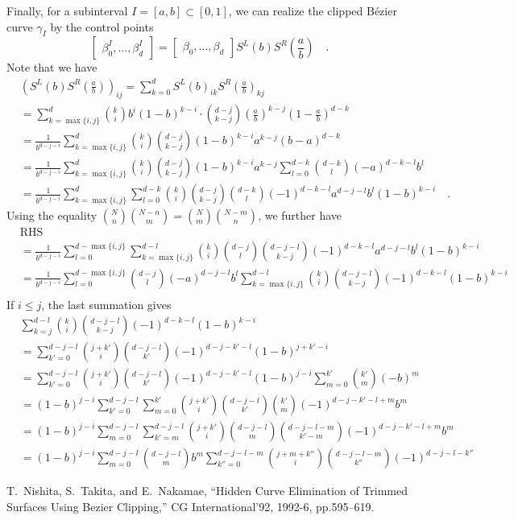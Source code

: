 \documentclass[pdftex,a4paper,12pt]{scrartcl}
\theoremstyle{plain}
\theoremstyle{definition}
\theoremstyle{remark}
\numberwithin{equation}{section}
\begin{document}
Finally, for a subinterval $I=[a,b]\subset[0,1]$, we can realize the clipped B\'ezier curve $\gamma_I$ by the control points
\[
\begin{bmatrix}
\beta^I_0,\dots,\beta^I_d
\end{bmatrix}
=
\begin{bmatrix}
\beta_0,\dots,\beta_d
\end{bmatrix}
S^L(b)S^R(\frac{a}{b})
\quad.
\]
Note that we have
\[
\begin{split}
&\left(S^L(b)S^R(\frac{a}{b})\right)_{ij}
= \sum_{k=0}^d S^L(b)_{ik}S^R(\frac{a}{b})_{kj} \\
&= \sum_{k=\max\{i,j\}}^d\binom{k}{i}b^i(1-b)^{k-i}\cdot\binom{d-j}{k-j}\left(\frac{a}{b}\right)^{k-j}\left(1-\frac{a}{b}\right)^{d-k} \\
&= \frac1{b^{d-j-i}}\sum_{k=\max\{i,j\}}^d \binom{k}{i}\binom{d-j}{k-j}(1-b)^{k-i}a^{k-j}(b-a)^{d-k} \\
&= \frac1{b^{d-j-i}}\sum_{k=\max\{i,j\}}^d \binom{k}{i}\binom{d-j}{k-j}(1-b)^{k-i}a^{k-j}\sum_{l=0}^{d-k}\binom{d-k}{l}(-a)^{d-k-l}b^l \\
&= \frac1{b^{d-j-i}}\sum_{k=\max\{i,j\}}^d\sum_{l=0}^{d-k}\binom{k}{i}\binom{d-j}{k-j}\binom{d-k}{l}(-1)^{d-k-l}a^{d-j-l}b^l(1-b)^{k-i}
\quad.
\end{split}
\]
Using the equality $\binom{N}{n}\binom{N-n}{m} = \binom{N}{m}\binom{N-m}{n}$, we further have
\[
\begin{split}
&\mathrm{RHS} \\
&= \frac1{b^{d-j-i}}\sum_{l=0}^{d-\max\{i,j\}}\sum_{k=\max\{i,j\}}^{d-l} \binom{k}{i}\binom{d-j}{l}\binom{d-j-l}{k-j}(-1)^{d-k-l}a^{d-j-l}b^l(1-b)^{k-i} \\
&= \frac1{b^{d-j-i}}\sum_{l=0}^{d-\max\{i,j\}}\binom{d-j}{l}(-a)^{d-j-l}b^l\sum_{k=\max\{i,j\}}^{d-l} \binom{k}{i}\binom{d-j-l}{k-j}(-1)^{d-k-l}(1-b)^{k-i} \\
\end{split}
\]
If $i\le j$, the last summation gives
\[
\begin{split}
&\sum_{k=j}^{d-l} \binom{k}{i}\binom{d-j-l}{k-j}(-1)^{d-k-l}(1-b)^{k-i} \\
&= \sum_{k'=0}^{d-j-l}\binom{j+k'}{i}\binom{d-j-l}{k'}(-1)^{d-j-k'-l}(1-b)^{j+k'-i} \\
&= \sum_{k'=0}^{d-j-l}\binom{j+k'}{i}\binom{d-j-l}{k'}(-1)^{d-j-k'-l}(1-b)^{j-i}\sum_{m=0}^{k'}\binom{k'}{m}(-b)^m \\
&= (1-b)^{j-i}\sum_{k'=0}^{d-j-l}\sum_{m=0}^{k'}\binom{j+k'}{i}\binom{d-j-l}{k'}\binom{k'}{m}(-1)^{d-j-k'-l+m}b^m \\
&= (1-b)^{j-i}\sum_{m=0}^{d-j-l}\sum_{k'=m}^{d-j-l}\binom{j+k'}{i}\binom{d-j-l}{m}\binom{d-j-l-m}{k'-m}(-1)^{d-j-k'-l+m}b^m \\
&= (1-b)^{j-i}\sum_{m=0}^{d-j-l}\binom{d-j-l}{m}b^m\sum_{k''=0}^{d-j-l-m}\binom{j+m+k''}{i}\binom{d-j-l-m}{k''}(-1)^{d-j-l-k''}\end{split}
\]

\begin{thebibliography}{99}
   T.~Nishita, S.~Takita, and E.~Nakamae, ``Hidden Curve Elimination of Trimmed Surfaces Using Bezier Clipping,'' CG International'92, 1992-6, pp.595--619.
\end{thebibliography}
\end{document}

